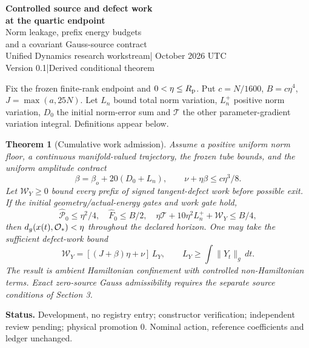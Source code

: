 \documentclass[11pt,a4paper]{article}
\newtheorem{theorem}{Theorem}\newtheorem{lemma}[theorem]{Lemma}
\begin{document}
\begin{center}
{\Large\bfseries Controlled source and defect work\\at the quartic endpoint}\\[9pt]
{\large Norm leakage, prefix energy budgets\\and a covariant Gauss-source contract}\\[9pt]
Unified Dynamics research workstream\quad | October 2026 UTC\\
Version 0.1\quad |\quad Derived conditional theorem
\end{center}
\begin{abstract}
We extend the finite tetrahedral endpoint admission theorem to continuous controlled trajectories with varying positive matter norms and a tangent implementation defect. A lower bound on the matter hopping energy makes norm loss nonpositive in the moving-reference energy balance; only positive norm variation spends the base norm-work allowance. Other parameter changes and defect work share an explicit cumulative budget. Signed defect work must be bounded at every prefix, rather than only at the final time. We derive the exact matrix Gauss-source law and a drift envelope, translate additive raw matter forcing into norm and normalized tangent defects, and give a constant-rate horizon inequality. These are mathematical input contracts; they do not construct a physical source sector, repair the zero-source constraints or certify an unspecified numerical algorithm.
\end{abstract}
Fix the frozen finite-rank endpoint and $0<\eta\le R_{\rm p}$. Put $c=N/1600$, $B=c\eta^4$, $J=\max(a,25N)$. Let $L_n$ bound total norm variation, $L_n^+$ positive norm variation, $D_0$ the initial norm-error sum and $\mathcal T$ the other parameter-gradient variation integral. Definitions appear below.
\begin{theorem}[Cumulative work admission]\label{th:main}
Assume a positive uniform norm floor, a continuous manifold-valued trajectory, the frozen tube bounds, and the uniform amplitude contract
\[
\beta=\beta_o+20(D_0+L_n),\qquad \nu+\eta\beta\le c\eta^3/8.
\]
Let $\mathcal W_Y\ge0$ bound every prefix of signed tangent-defect work before possible exit. If the initial geometry/actual-energy gates and work gate hold,
\[
\boxed{\widehat{\mathcal P}_0\le\eta^2/4,\quad \widehat F_0\le B/2,\quad
\eta\mathcal T+10\eta^2L_n^++\mathcal W_Y\le B/4,}
\]
then $d_g(x(t),\mathcal O_*)<\eta$ throughout the declared horizon. One may take the sufficient defect-work bound
\[
\mathcal W_Y=[(J+\beta)\eta+\nu]\,L_Y,\qquad
L_Y\ge\int\|Y_t\|_g\,dt.
\]
The result is ambient Hamiltonian confinement with controlled non-Hamiltonian terms. Exact zero-source Gauss admissibility requires the separate source conditions of Section 3.
\end{theorem}
\textbf{Status.} Development, no registry entry; constructor verification; independent review pending; physical promotion $0$. Nominal action, reference coefficients and ledger unchanged.
\newpage
\end{document}
